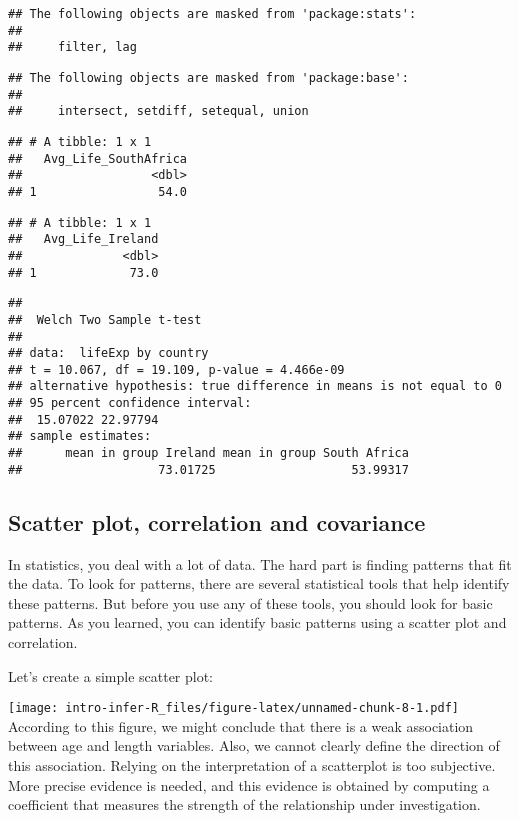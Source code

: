 \documentclass[
]{article}
\begin{document}
\begin{verbatim}
## The following objects are masked from 'package:stats':
## 
##     filter, lag
\end{verbatim}

\begin{verbatim}
## The following objects are masked from 'package:base':
## 
##     intersect, setdiff, setequal, union
\end{verbatim}

\begin{verbatim}
## # A tibble: 1 x 1
##   Avg_Life_SouthAfrica
##                  <dbl>
## 1                 54.0
\end{verbatim}

\begin{verbatim}
## # A tibble: 1 x 1
##   Avg_Life_Ireland
##              <dbl>
## 1             73.0
\end{verbatim}

\begin{verbatim}
## 
##  Welch Two Sample t-test
## 
## data:  lifeExp by country
## t = 10.067, df = 19.109, p-value = 4.466e-09
## alternative hypothesis: true difference in means is not equal to 0
## 95 percent confidence interval:
##  15.07022 22.97794
## sample estimates:
##      mean in group Ireland mean in group South Africa 
##                   73.01725                   53.99317
\end{verbatim}

\hypertarget{scatter-plot-correlation-and-covariance}{%
\subsection{Scatter plot, correlation and
covariance}\label{scatter-plot-correlation-and-covariance}}

In statistics, you deal with a lot of data. The hard part is finding
patterns that fit the data. To look for patterns, there are several
statistical tools that help identify these patterns. But before you use
any of these tools, you should look for basic patterns. As you learned,
you can identify basic patterns using a scatter plot and correlation.

Let's create a simple scatter plot:

\texttt{[image: intro-infer-R\_files/figure-latex/unnamed-chunk-8-1.pdf]}
According to this figure, we might conclude that there is a weak
association between age and length variables. Also, we cannot clearly
define the direction of this association. Relying on the interpretation
of a scatterplot is too subjective. More precise evidence is needed, and
this evidence is obtained by computing a coefficient that measures the
strength of the relationship under investigation.
\end{document}
